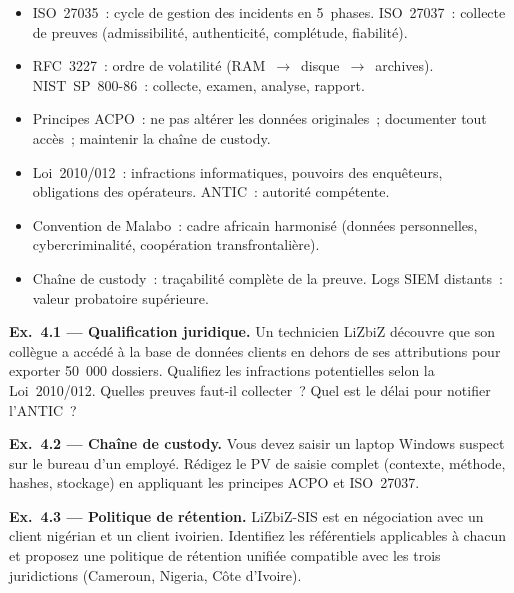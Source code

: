 \begin{boxresume}
\begin{itemize}
  \item ISO~27035~: cycle de gestion des incidents en 5~phases.
        ISO~27037~: collecte de preuves (admissibilité, authenticité,
        complétude, fiabilité).
  \item RFC~3227~: ordre de volatilité (RAM~$\to$~disque~$\to$~archives).
        NIST~SP~800-86~: collecte, examen, analyse, rapport.
  \item Principes ACPO~: ne pas altérer les données originales~;
        documenter tout accès~; maintenir la chaîne de custody.
  \item Loi~2010/012~: infractions informatiques, pouvoirs des
        enquêteurs, obligations des opérateurs. ANTIC~: autorité compétente.
  \item Convention de Malabo~: cadre africain harmonisé (données
        personnelles, cybercriminalité, coopération transfrontalière).
  \item Chaîne de custody~: traçabilité complète de la preuve.
        Logs SIEM distants~: valeur probatoire supérieure.
\end{itemize}
\end{boxresume}

\begin{boxexo}
\textbf{Ex.~4.1 — Qualification juridique.}
Un technicien LiZbiZ découvre que son collègue a accédé à la base de
données clients en dehors de ses attributions pour exporter 50~000 dossiers.
Qualifiez les infractions potentielles selon la Loi~2010/012. Quelles
preuves faut-il collecter~? Quel est le délai pour notifier l'ANTIC~?

\medskip\textbf{Ex.~4.2 — Chaîne de custody.}
Vous devez saisir un laptop Windows suspect sur le bureau d'un employé.
Rédigez le PV de saisie complet (contexte, méthode, hashes, stockage)
en appliquant les principes ACPO et ISO~27037.

\medskip\textbf{Ex.~4.3 — Politique de rétention.}
LiZbiZ-SIS est en négociation avec un client nigérian et un client
ivoirien. Identifiez les référentiels applicables à chacun et proposez
une politique de rétention unifiée compatible avec les trois juridictions
(Cameroun, Nigeria, Côte d'Ivoire).
\end{boxexo}

